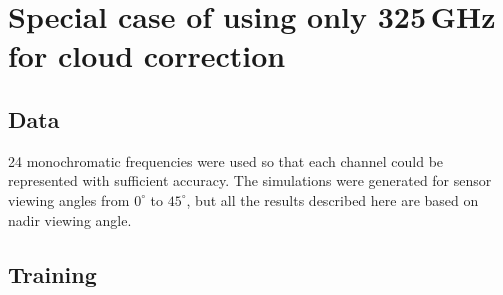 \documentclass[amt, manuscript]{copernicus}
\begin{document}







\section{Special case of using only 325\,GHz for cloud correction}

\subsection{Data}
24 monochromatic frequencies were used so that each channel could be represented
with sufficient accuracy. The simulations were generated for sensor viewing angles from
$0^{\circ}$ to $45^{\circ}$, but all the results described here are based on nadir viewing angle.


\subsection{Training}
\end{document}
